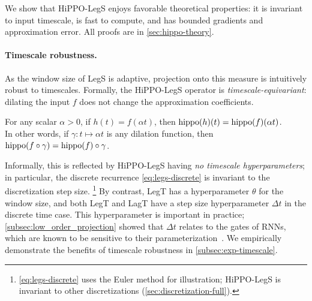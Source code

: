 We show that HiPPO-LegS enjoys favorable
theoretical properties: it is invariant to input timescale, is fast to compute,
and has bounded gradients and approximation error.
All proofs are in \cref{sec:hippo-theory}.

\paragraph{Timescale robustness.}
As the window size of LegS is adaptive, %
projection onto this measure is intuitively robust to timescales.
Formally, the HiPPO-LegS operator is \emph{timescale-equivariant}:
dilating the input $f$ does not change the approximation coefficients.
\begin{proposition}
    \label{prop:timescale}
    For any scalar $\alpha > 0$, if $h(t) = f(\alpha t)$, then
    $\operatorname{hippo}(h)(t) = \operatorname{hippo}(f)(\alpha t)$.
    \\ In other words, if $\gamma : t \mapsto \alpha t$ is any dilation function, then
    $\operatorname{hippo}(f \circ \gamma) = \operatorname{hippo}(f) \circ \gamma$.
\end{proposition}

Informally, this is reflected by HiPPO-LegS having \emph{no timescale hyperparameters};
in particular, the discrete recurrence \eqref{eq:legs-discrete} is invariant to the discretization step size.%
\footnote{\eqref{eq:legs-discrete} uses the Euler method for illustration; HiPPO-LegS is invariant to other discretizations (\cref{sec:discretization-full}).}
By contrast, LegT has a hyperparameter $\theta$ for the window size, and both LegT and LagT have a step size hyperparameter $\Delta t$ in the discrete time case.
This hyperparameter is important in practice; \cref{subsec:low_order_projection} showed that $\Delta t$ relates to the gates of RNNs, which are known to be sensitive to their parameterization~\cite{jozefowicz2015empirical,tallec2018can,gu2020improving}.
We empirically demonstrate the benefits of timescale robustness in \cref{subsec:exp-timescale}.









